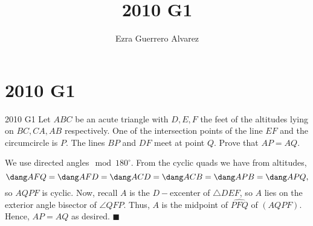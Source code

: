 \documentclass[14pt]{article}
\title{2010 G1}
\author{Ezra Guerrero Alvarez}
\begin{document}
\maketitle
	
\section*{2010 G1}

\begin{statement}{2010 G1}
	Let $ABC$ be an acute triangle with $D, E, F$ the feet of the altitudes lying on $BC, CA, AB$ respectively. One of the intersection points of the line $EF$ and the circumcircle is $P.$ The lines $BP$ and $DF$ meet at point $Q.$ Prove that $AP = AQ$.
\end{statement}
We use directed angles$\mod180^\circ$. From the cyclic quads we have from altitudes,
\[ \dang AFQ = \dang AFD = \dang ACD = \dang ACB = \dang APB = \dang APQ, \]
so $AQPF$ is cyclic. Now, recall $A$ is the $D-$excenter of $\triangle DEF$, so $A$ lies on the exterior angle bisector of $\angle QFP$. Thus, $A$ is the midpoint of $\widehat{PFQ}$ of $(AQPF)$. Hence, $AP=AQ$ as desired. $\blacksquare$
	
\end{document}
